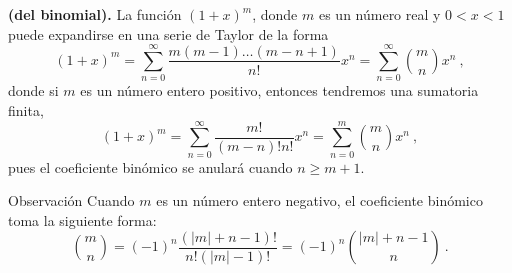 \begin{teorema}{\textbf{(del binomial).}}
    La función $(1+x)^m$, donde $m$ es un número real y $0 < x < 1$ puede expandirse en una serie de Taylor de la forma 
    \begin{equation}
        (1+x)^m  = \sum_{n=0}^\infty \frac{m (m-1) \dots (m-n+1)}{n!} x^n = \sum_{n=0}^\infty \binom{m}{n} x^n \ ,
    \end{equation}
    donde si $m$ es un número entero positivo, entonces tendremos una sumatoria finita,
    \begin{equation}
        (1+x)^m = \sum_{n=0}^\infty \frac{m!}{(m-n)!n!} x^n = \sum_{n=0}^m \binom{m}{n} x^n \ ,
    \end{equation}
    pues el coeficiente binómico se anulará cuando $n \geq m+1$.
\end{teorema}

\begin{obs}{Observación}
    Cuando $m$ es un número entero negativo, el coeficiente binómico toma la siguiente forma:
    \begin{equation}
        \binom{m}{n} = (-1)^n \frac{(|m|+n-1)!}{n! (|m|-1)!} = (-1)^n \binom{|m|+n-1}{n} \ .
    \end{equation}
\end{obs}
